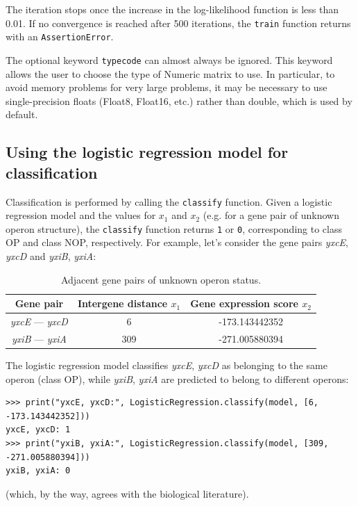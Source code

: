 \documentclass{report}
\begin{document}
The iteration stops once the increase in the log-likelihood function is less than 0.01. If no convergence is reached after 500 iterations, the \verb+train+ function returns with an \verb+AssertionError+.

The optional keyword \verb+typecode+ can almost always be ignored. This keyword allows the user to choose the type of Numeric matrix to use. In particular, to avoid memory problems for very large problems, it may be necessary to use single-precision floats (Float8, Float16, etc.) rather than double, which is used by default.

\subsection{Using the logistic regression model for classification}

Classification is performed by calling the \verb+classify+ function. Given a logistic regression model and the values for $x_1$ and $x_2$ (e.g. for a gene pair of unknown operon structure), the \verb+classify+ function returns \verb+1+ or \verb+0+, corresponding to class OP and class NOP, respectively. For example, let's consider the gene pairs {\it yxcE}, {\it yxcD} and {\it yxiB}, {\it yxiA}:

\begin{table}[h]
\begin{center}
\caption{Adjacent gene pairs of unknown operon status.}
\begin{tabular}{|c|c|c|}
\hline
Gene pair & Intergene distance $x_1$ & Gene expression score $x_2$ \\
\hline
{\it yxcE} --- {\it yxcD} & 6 & -173.143442352 \\
{\it yxiB} --- {\it yxiA} & 309 & -271.005880394 \\
\hline
\end{tabular}
\end{center}
\end{table}

The logistic regression model classifies {\it yxcE}, {\it yxcD} as belonging to the same operon (class OP), while {\it yxiB}, {\it yxiA} are predicted to belong to different operons:
\begin{verbatim}
>>> print("yxcE, yxcD:", LogisticRegression.classify(model, [6, -173.143442352]))
yxcE, yxcD: 1
>>> print("yxiB, yxiA:", LogisticRegression.classify(model, [309, -271.005880394]))
yxiB, yxiA: 0
\end{verbatim}
(which, by the way, agrees with the biological literature).
\end{document}
